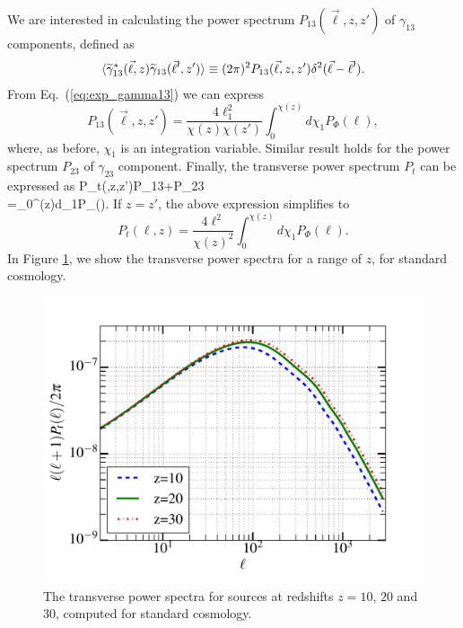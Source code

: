 We are interested in calculating the power spectrum $P_{13}(\vec{\ell},z,z')$ of $\gamma_{13}$ components, defined as
\begin{equation}
\begin{gathered}
\langle\widetilde{\gamma}_{13}^*(\vec{\ell},z)\widetilde{\gamma}_{13}(\vec{\ell}',z')\rangle\equiv(2\pi)^2P_{13}(\vec{\ell},z,z')\delta^2(\vec{\ell}-\vec{\ell}').
\end{gathered}
\end{equation}
From Eq.~(\ref{eq:exp_gamma13}) we can express
\begin{equation}
P_{13}(\vec{\ell},z,z')=\frac{4\ell_1^2}{\chi(z)\chi(z')}\int_0^{\chi(z)}d\chi_1P_{\Phi}(\ell),
\end{equation}
where, as before, $\chi_1$ is an integration variable.
Similar result holds for the power spectrum $P_{23}$ of $\gamma_{23}$ component. Finally, the transverse power spectrum $P_t$ can be expressed as 
\beq
\bga
P_t(\ell,z,z')\equiv P_{13}+P_{23}\\
=\int_0^{\chi(z)}d\chi_1P_{\Phi}(\ell).
\ega
\eeq
If $z=z'$, the above expression simplifies to
\begin{equation}
P_t(\ell,z)=\frac{4\ell^2}{\chi(z)^2}\int_0^{\chi(z)}d\chi_1P_{\Phi}(\ell).
\end{equation}
In Figure \ref{fig:Pt}, we show the transverse power spectra for a range of $z$, for standard cosmology.
\begin{figure}
\centering
\includegraphics[scale=0.45]{lensing_transverse.pdf}
\caption{The transverse power spectra for sources at redshifts $z=10$, $20$ and $30$, computed for standard cosmology.}
\label{fig:Pt}
\end{figure}

